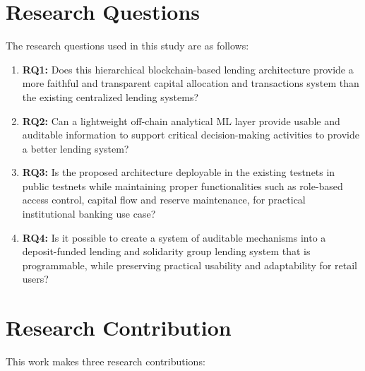 \documentclass[12pt, a4paper]{report}
\begin{document}
\section{Research Questions}
\label{sec:research-questions}

The research questions used in this study are as follows:

\begin{enumerate}[noitemsep]
\item \textbf{RQ1:} Does this hierarchical blockchain-based lending architecture provide a more faithful and transparent capital allocation and transactions system than the existing centralized lending systems?
\item \textbf{RQ2:} Can a lightweight off-chain analytical ML layer provide usable and auditable information to support critical decision-making activities to provide a better lending system?
\item \textbf{RQ3:} Is the proposed architecture deployable in the existing testnets in public testnets while maintaining proper functionalities such as role-based access control, capital flow and reserve maintenance, for practical institutional banking use case?
\item \textbf{RQ4:} Is it possible to create a system of auditable mechanisms into a deposit-funded lending and solidarity group lending system that is programmable, while preserving practical usability and adaptability for retail users?
\end{enumerate}

\section{Research Contribution}
\label{sec:research-contribution}

This work makes three research contributions:
\end{document}
